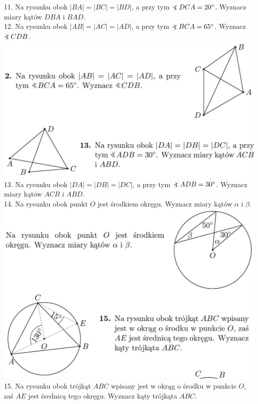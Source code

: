 \documentclass[10pt]{article}
\newcommand\Varangle{\mathop{{<\!\!\!\!\!\text{\small)}}\:}\nolimits}
\begin{document}
11. Na rysunku obok \(|B A|=|B C|=|B D|\), a przy tym \(\Varangle D C A=20^{\circ}\). Wyznacz miary kątów \(D B A\) i \(B A D\).\\
12. Na rysunku obok \(|A B|=|A C|=|A D|\), a przy tym \(\Varangle B C A=65^{\circ}\). Wyznacz \(\Varangle C D B\).\\
\includegraphics[max width=\textwidth, center]{2024_11_21_71f62bd117d375398909g-184(1)}\\
13. Na rysunku obok \(|D A|=|D B|=|D C|\), a przy tym \(\Varangle A D B=30^{\circ}\). Wyznacz miary kątów \(A C B\) i \(A B D\).\\
14. Na rysunku obok punkt \(O\) jest środkiem okręgu. Wyznacz miary kątów \(\alpha\) i \(\beta\).\\
\includegraphics[max width=\textwidth, center]{2024_11_21_71f62bd117d375398909g-184(2)}\\
15. Na rysunku obok trójkąt \(A B C\) wpisany jest w okrąg o środku w punkcie \(O\), zaś \(A E\) jest średnicą tego okręgu. Wyznacz kąty trójkąta \(A B C\).\\
\end{document}
